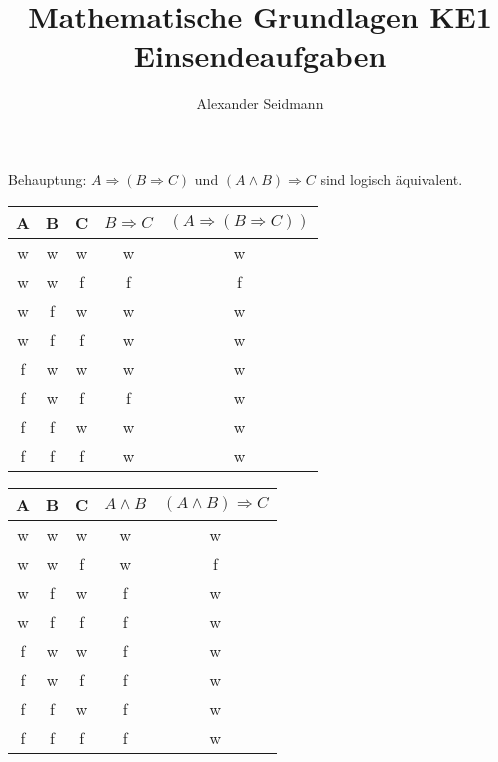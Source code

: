 \documentclass{article}
\title{Mathematische Grundlagen KE1 Einsendeaufgaben}
\author{Alexander Seidmann}
\begin{document}
\maketitle{}
\setcounter{section}{1}
\subsection{}
\subsubsection{}
Behauptung: $A\Rightarrow (B\Rightarrow C)$ und $(A\land B)\Rightarrow C$ sind logisch äquivalent.

\begin{center}
    \begin{tabular}{|c|c|c|c|c|}
        \hline
        A & B & C & $B\Rightarrow C$ & $(A\Rightarrow (B\Rightarrow C))$ \\
        \hline
        w & w & w & w & w \\
        w & w & f & f & f \\
        w & f & w & w & w \\
        w & f & f & w & w \\
        f & w & w & w & w \\
        f & w & f & f & w \\
        f & f & w & w & w \\
        f & f & f & w & w \\
        \hline
    \end{tabular}
\end{center}

\begin{center}
    \begin{tabular}{|c|c|c|c|c|}
        \hline
        A & B & C & $A\land B$ & $(A\land B)\Rightarrow C$ \\
        \hline
        w & w & w & w & w \\
        w & w & f & w & f \\
        w & f & w & f & w \\
        w & f & f & f & w \\
        f & w & w & f & w \\
        f & w & f & f & w \\
        f & f & w & f & w \\
        f & f & f & f & w \\
        \hline
    \end{tabular}
\end{center}
\end{document}
